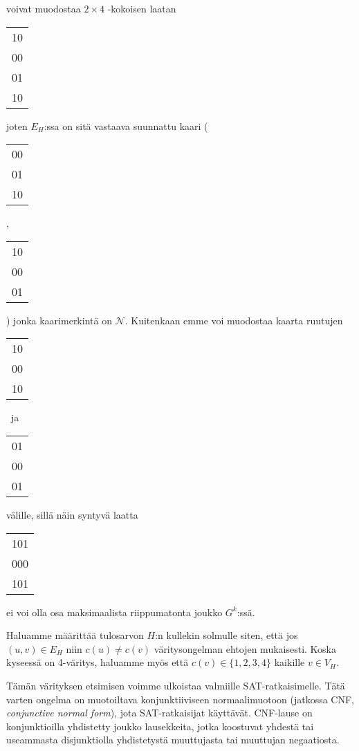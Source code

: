 \documentclass[12pt,finnish]{tktltiki2}
\theoremstyle{definition}
\theoremstyle{remark}
\begin{document}
voivat muodostaa $2 \times 4$ -kokoisen laatan
\begin{tabular}{| c |}
\hline
10 \\
00 \\
01 \\
10 \\
\hline
\end{tabular}
joten $E_H$:ssa on sitä vastaava suunnattu kaari \Bigg(
\begin{tabular}{ | c | }
  \hline
  00 \\
  01 \\
  10 \\
  \hline
\end{tabular}
,
\begin{tabular}{ | c | }
  \hline
  10 \\
  00 \\
  01 \\
  \hline
\end{tabular}
\Bigg) jonka kaarimerkintä on $\mathcal{N}$. Kuitenkaan emme voi muodostaa kaarta ruutujen
\begin{center}
\begin{tabular}{| c |}
 \hline
 10 \\
 00 \\
 10 \\
 \hline
\end{tabular}
~ja~
\begin{tabular}{| c |}
 \hline
 01 \\
 00 \\
 01 \\
 \hline
\end{tabular}
\end{center}
välille, sillä näin syntyvä laatta
\begin{tabular}{| c |}
 \hline
 101 \\
 000 \\
 101 \\
 \hline
\end{tabular}
ei voi olla osa maksimaalista riippumatonta joukko $G^k$:ssä.

Haluamme määrittää tulosarvon $H$:n kullekin solmulle siten, että jos $(u, v) \in E_H$ niin $c(u) \neq c(v)$ väritysongelman ehtojen mukaisesti. Koska kyseessä on 4-väritys, haluamme myös että $c(v) \in \{1, 2, 3, 4\}$ kaikille $v \in V_H$.

Tämän värityksen etsimisen voimme ulkoistaa valmiille SAT-ratkaisimelle. Tätä varten ongelma on muotoiltava konjunktiiviseen normaalimuotoon (jatkossa CNF, \textit{conjunctive normal form}), jota SAT-ratkaisijat käyttävät. CNF-lause on konjunktioilla yhdistetty joukko lausekkeita, jotka koostuvat yhdestä tai useammasta disjunktiolla yhdistetystä muuttujasta tai muuttujan negaatiosta.
\end{document}
